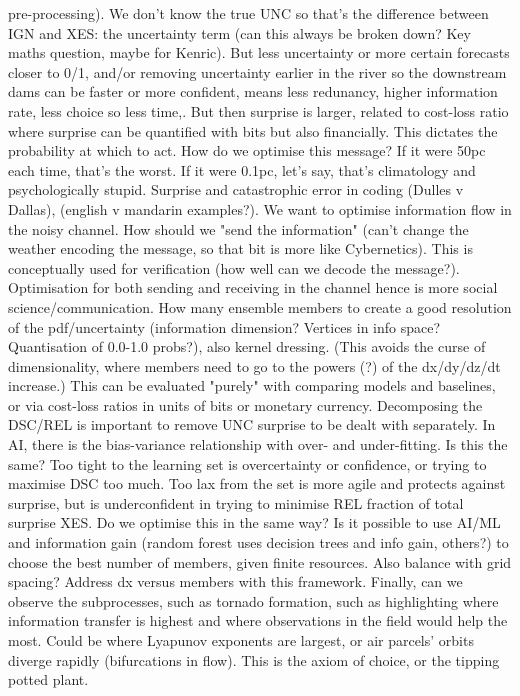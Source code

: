 \documentclass[draft]{ametsoc}
\begin{document}
pre-processing). We don't know the true UNC so that's the difference between IGN and XES: the uncertainty term (can this always be broken down? Key maths question, maybe for Kenric). But less uncertainty or more certain forecasts closer to 0/1, and/or removing uncertainty earlier in the river so the downstream dams can be faster or more confident, means less redunancy, higher information rate, less choice so less time,. But then surprise is larger, related to cost-loss ratio where surprise can be quantified with bits but also financially. This dictates the probability at which to act. How do we optimise this message? If it were 50pc each time, that's the worst. If it were 0.1pc, let's say, that's climatology and psychologically stupid. Surprise and catastrophic error in coding (Dulles v Dallas), (english v mandarin examples?). We want to optimise information flow in the noisy channel. How should we "send the information" (can't change the weather encoding the message, so that bit is more like Cybernetics). This is conceptually used for verification (how well can we decode the message?). Optimisation for both sending and receiving in the channel hence is more social science/communication. How many ensemble members to create a good resolution of the pdf/uncertainty (information dimension? Vertices in info space? Quantisation of 0.0-1.0 probs?), also kernel dressing. (This avoids the curse of dimensionality, where members need to go to the powers (?) of the dx/dy/dz/dt increase.) This can be evaluated "purely" with comparing models and baselines, or via cost-loss ratios in units of bits or monetary currency. Decomposing the DSC/REL is important to remove UNC surprise to be dealt with separately. In AI, there is the bias-variance relationship with over- and under-fitting. Is this the same? Too tight to the learning set is overcertainty or confidence, or trying to maximise DSC too much. Too lax from the set is more agile and protects against surprise, but is underconfident in trying to minimise REL fraction of total surprise XES. Do we optimise this in the same way? Is it possible to use AI/ML and information gain (random forest uses decision trees and info gain, others?) to choose the best number of members, given finite resources. Also balance with grid spacing? Address dx versus members with this framework. Finally, can we observe the subprocesses, such as tornado formation, such as highlighting where information transfer is highest and where observations in the field would help the most. Could be where Lyapunov exponents are largest, or air parcels' orbits diverge rapidly (bifurcations in flow). This is the axiom of choice, or the tipping potted plant.
\end{document}
